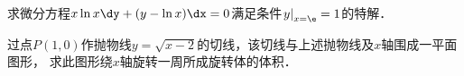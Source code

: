 \documentclass[plain,noanswer,medmath]{../../template/jnuexam}
\begin{document}






























\begin{problem}
求微分方程$x\ln x\dy+(y-\ln x)\dx=0$满足条件$\left.y\right|_{x=\e}=1$的特解．
\end{problem}


\begin{problem}
过点$P(1,0)$作抛物线$y=\sqrt{x-2}$的切线，该切线与上述抛物线及$x$轴围成一平面图形，
求此图形绕$x$轴旋转一周所成旋转体的体积．
\end{problem}














\end{document}
